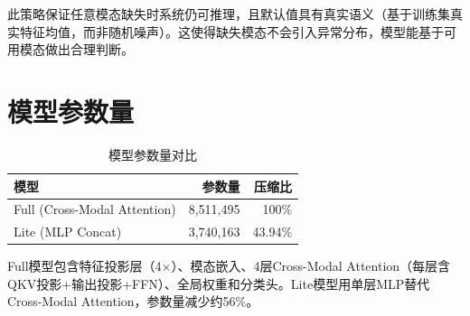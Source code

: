 此策略保证任意模态缺失时系统仍可推理，且默认值具有真实语义（基于训练集真实特征均值，而非随机噪声）。这使得缺失模态不会引入异常分布，模型能基于可用模态做出合理判断。

\section{模型参数量}

\begin{table}[H]
\centering
\caption{模型参数量对比}
\label{tab:params}
\begin{tabular}{lrr}
\toprule
模型 & 参数量 & 压缩比 \\
\midrule
Full (Cross-Modal Attention) & 8,511,495 & 100\% \\
Lite (MLP Concat) & 3,740,163 & 43.94\% \\
\bottomrule
\end{tabular}
\end{table}

Full模型包含特征投影层（4$\times$）、模态嵌入、4层Cross-Modal Attention（每层含QKV投影+输出投影+FFN）、全局权重和分类头。Lite模型用单层MLP替代Cross-Modal Attention，参数量减少约56\%。
